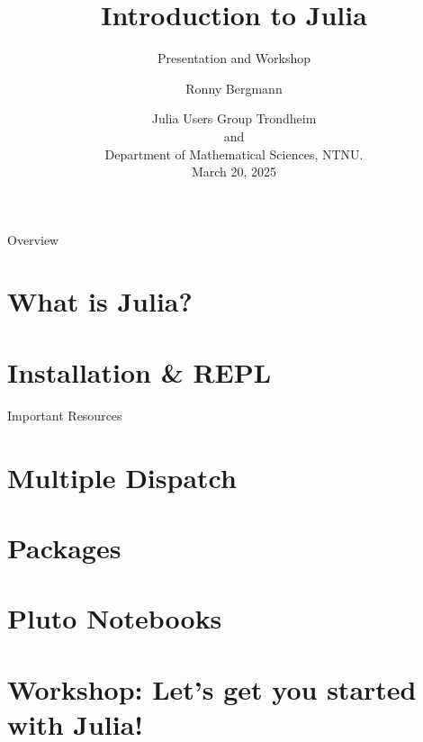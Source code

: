 \documentclass[aspectratio=169, handout]{beamer}
\title{Introduction to Julia}
\subtitle{Presentation and Workshop}
\author{Ronny Bergmann}
\date{Julia Users Group Trondheim\\ and\\
    Department of Mathematical Sciences, NTNU.\\[\baselineskip]March 20, 2025}
\begin{document}
	\maketitle
    \begin{frame}{Overview}
        \tableofcontents
    \end{frame}
    \section{What is Julia?}
    \section{Installation \& REPL}
    \begin{frame}{Important Resources}

    \end{frame}
    \section{Multiple Dispatch}
    \section{Packages}
    \section{Pluto Notebooks}
    \section{Workshop: Let's get you started with Julia!}
\end{document}
